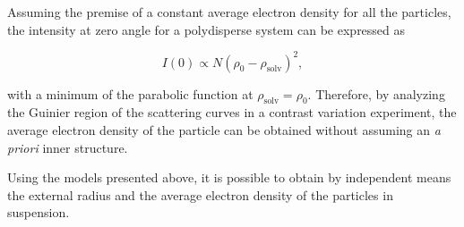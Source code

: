Assuming the premise of a constant average electron density for all the particles, the intensity at zero angle for a polydisperse system can be expressed as

\begin{equation}
\label{eq:I0}
I(0)\propto N \left( \rho_0-\rho_{\text{solv}} \right)^2 ,
\end{equation}

with a minimum of the parabolic function at \( \rho_{\text{solv}}=\rho_0 \). Therefore, by analyzing the Guinier region of the scattering curves in a contrast variation experiment, the average electron density of the particle can be obtained without assuming an \emph{a priori} inner structure.

Using the models presented above, it is possible to obtain by independent means the external radius and the average electron density of the particles in suspension.
